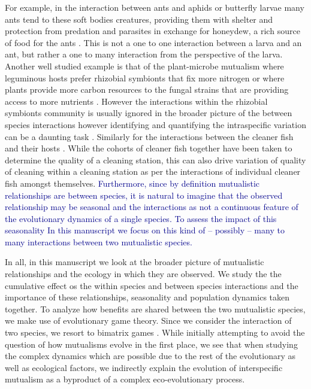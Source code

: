\documentclass{pnastwo}
\newcommand{\cha}[1]{\textcolor{darkblue}{#1}}
\begin{document}
\begin{article}
For example, in the interaction between ants and aphids or butterfly larvae \cite{pierce:BES:1987,hoelldobler:book:1990} many ants tend to these soft bodies creatures, providing them with shelter and protection from predation and parasites in exchange for honeydew, a rich source of food for the ants \cite{hill:OEC:1989,stadler:book:2008}.
This is not a one to one interaction between a larva and an ant, but rather a one to many interaction from the perspective of the larva.
Another well studied example is that of the plant-microbe mutualism where leguminous hosts prefer rhizobial symbionts that fix more nitrogen \cite{kiers:Nature:2003} or where plants provide more carbon resources to the fungal strains that are providing access to more nutrients \cite{kiers:Science:2011}.
However the interactions within the rhizobial symbionts community is usually ignored in the broader picture of the between species interactions however identifying and quantifying the intraspecific variation can be a daunting task \cite{behm:JE:2014}.
Similarly for the interactions between the cleaner fish and their hosts \cite{bshary:AB:2002,bshary:book:2003}. 
While the cohorts of cleaner fish together have been taken to determine the quality of a cleaning station, this can also drive variation of quality of cleaning within a cleaning station as per the interactions of individual cleaner fish amongst themselves.
\cha{Furthermore, since by definition mutualistic relationships are between species, it is natural to imagine that the observed relationship may be seasonal and the interactions as not a continuous feature of the evolutionary dynamics of a single species.
To assess the impact of this seasonality
In this manuscript we focus on this kind of -- possibly -- many to many interactions between two mutualistic species.}

In all, in this manuscript we look at the broader picture of mutualistic relationships and the ecology in which they are observed.
We study the the cumulative effect os the within species and between species interactions and the importance of these relationships, seasonality and population dynamics taken together.
To analyze how benefits are shared between the two mutualistic species, we make use of evolutionary game theory.
Since we consider the interaction of two species, we resort to bimatrix games
\cite{weibull:book:1995,hofbauer:JMB:1996,hofbauer:book:1998}.
While initially attempting to avoid the question of how mutualisms evolve in the first place, we see that when studying the complex dynamics which are possible due to the rest of the evolutionary as well as ecological factors, we indirectly explain the evolution of interspecific mutualism as a byproduct of a complex eco-evolutionary process.




\end{article}
\end{document}
